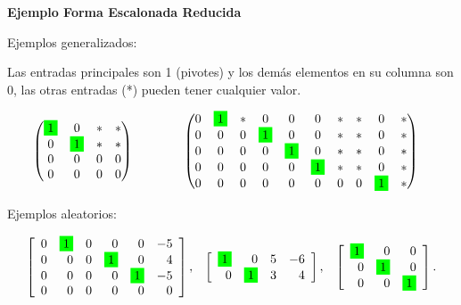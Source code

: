 \documentclass{article}
\begin{document}
\begin{large}
    \textbf{Ejemplo Forma Escalonada Reducida}
\end{large}

Ejemplos generalizados:

Las entradas principales son 1 (pivotes) y los demás elementos en su columna son 0, las otras entradas (*) pueden tener cualquier valor.

\begin{alignat*}{2}
    \begin{pmatrix}
        \colorbox{green}{1}&0&*&*\\
        0&\colorbox{green}{1}&*&*\\
        0&0&0&0\\
        0&0&0&0
    \end{pmatrix}
    & \hspace{ 4em}%
    \begin{pmatrix}
        0&\colorbox{green}{1}&*&0&0&0&*&*&0&*\\
        0&0&0&\colorbox{green}{1}&0&0&*&*&0&*\\
        0&0&0&0&\colorbox{green}{1}&0&*&*&0&*\\
        0&0&0&0&0&\colorbox{green}{1}&*&*&0&*\\
        0&0&0&0&0&0&0&0&\colorbox{green}{1}&*
    \end{pmatrix}
\end{alignat*}

Ejemplos aleatorios:

\begin{equation*}
    \begin{array}{lrl}
        {\left[\begin{array}{rrrrrr}
            0 & \colorbox{green}{1} & 0 & 0 & 0 & -5 \\
            0 & 0 & 0 & \colorbox{green}{1} & 0 & 4\\
            0 & 0 & 0 & 0 & \colorbox{green}{1} & -5\\
            0 & 0 & 0 & 0 & 0 & 0
            \end{array}\right],} 
            & {\left[\begin{array}{rrrr}
            \colorbox{green}{1} & 0 & 5 & -6 \\
            0 & \colorbox{green}{1} & 3 & 4 \\
            \end{array}\right],} 
            & {\left[\begin{array}{rrr}
            \colorbox{green}{1} & 0 & 0 \\
            0 & \colorbox{green}{1} & 0 \\
            0 & 0 & \colorbox{green}{1}
            \end{array}\right] .}
    \end{array}
\end{equation*}
\end{document}
